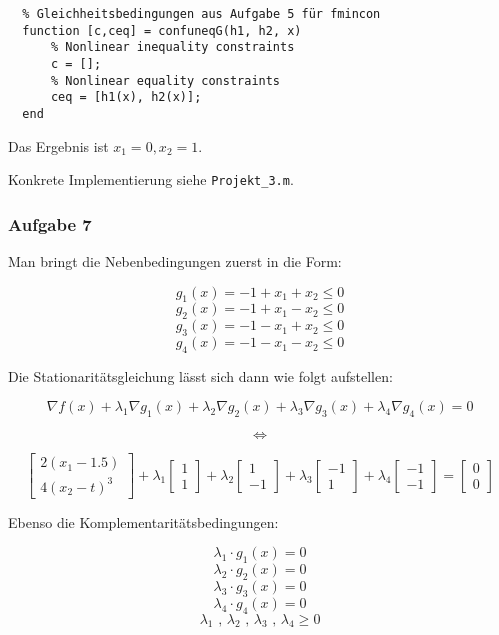 \documentclass[a4paper, 12pt]{report}
\begin{document}
\begin{lstlisting}
  % Gleichheitsbedingungen aus Aufgabe 5 für fmincon
  function [c,ceq] = confuneqG(h1, h2, x)
      % Nonlinear inequality constraints
      c = [];
      % Nonlinear equality constraints
      ceq = [h1(x), h2(x)];
  end\end{lstlisting}

Das Ergebnis ist $x_1 = 0, x_2 = 1$.

Konkrete Implementierung siehe \lstinline[basicstyle=\ttfamily\color{black}]|Projekt_3.m|.

\subsubsection{Aufgabe 7}

Man bringt die Nebenbedingungen zuerst in die Form:

$$g_1(x) = -1 + x_1 + x_2 \leq 0$$
$$g_2(x) = -1 + x_1 - x_2 \leq 0$$
$$g_3(x) = -1 - x_1 + x_2 \leq 0$$
$$g_4(x) = -1 - x_1 - x_2 \leq 0$$

Die Stationaritätsgleichung lässt sich dann wie folgt aufstellen:

$$\nabla  f(x) + \lambda_1\nabla g_1(x) + \lambda_2\nabla g_2(x) + \lambda_3\nabla g_3(x) + \lambda_4\nabla g_4(x) = 0$$

$$\Leftrightarrow$$

$$\begin{bmatrix}2(x_1 - 1.5)\\4(x_2 - t)^3\end{bmatrix} + \lambda_1 \begin{bmatrix}1\\1\end{bmatrix} + \lambda_2 \begin{bmatrix}1\\-1\end{bmatrix} + \lambda_3 \begin{bmatrix}-1\\1\end{bmatrix} + \lambda_4 \begin{bmatrix}-1\\-1\end{bmatrix} = \begin{bmatrix}0\\0\end{bmatrix}$$

Ebenso die Komplementaritätsbedingungen:

$$\lambda_1\cdot g_1(x) = 0$$
$$\lambda_2\cdot g_2(x) = 0$$
$$\lambda_3\cdot g_3(x) = 0$$
$$\lambda_4\cdot g_4(x) = 0$$
$$\lambda_1 \text{ , } \lambda_2 \text{ , } \lambda_3 \text{ , } \lambda_4 \geq 0$$
\end{document}
